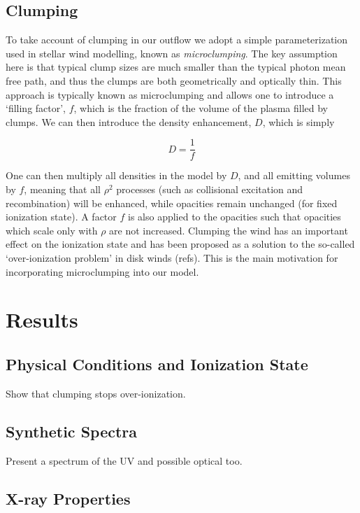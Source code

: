 \documentclass[useAMS,usenatbib]{mn2e_x}
\begin{document}
\subsection{Clumping}



To take account of clumping in our outflow we adopt a simple parameterization
used in stellar wind modelling, known as {\em microclumping}. 
The key assumption here is that typical clump sizes
are much smaller than the typical photon mean free path, and thus the clumps are 
both geometrically and optically thin. This approach is typically 
known as microclumping and allows one to introduce a `filling factor', $f$, which is the 
fraction of the volume of the plasma filled by clumps. We can then introduce the 
density enhancement, $D$, which is simply 

\begin{equation}
D = \frac{1}{f}
\end{equation}

One can then multiply all densities in the model by $D$, and all emitting volumes
by $f$, meaning that all $\rho^2$ processes 
(such as collisional excitation and recombination) will be enhanced, 
while opacities remain unchanged (for fixed ionization state). A factor $f$ is also
applied to the opacities such that opacities which scale only with $\rho$ are not
increased. Clumping the wind has an important effect on the ionization state and has
been proposed as a solution to the so-called `over-ionization problem' in 
disk winds (refs). This is the main motivation for incorporating microclumping
into our model.  


\section{Results}

\subsection{Physical Conditions and Ionization State}

Show that clumping stops over-ionization.

\subsection{Synthetic Spectra}

Present a spectrum of the UV and possible optical too.

\subsection{X-ray Properties}
\end{document}
